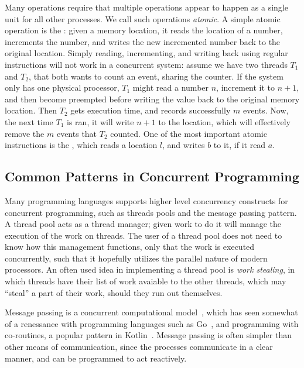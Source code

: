 Many operations require that multiple operations appear to happen as a single unit for all other
processes. We call such operations \emph{atomic}. A simple atomic operation is the
: given a memory location, it reads the location of a number, increments the
number, and writes the new incremented number back to the original location.  Simply reading,
incrementing, and writing back using regular instructions will not work in a concurrent system:
assume we have two threads $T_1$ and $T_2$, that both wants to count an event, sharing the counter.
If the system only has one physical processor, $T_1$ might read a number $n$, increment it to
$n+1$, and then become preempted before writing the value back to the original memory location.
Then $T_2$ gets execution time, and records successfully $m$ events. Now, the next time $T_1$ is
ran, it will write $n+1$ to the location, which will effectively remove the $m$ events that $T_2$
counted. One of the most important atomic instructions is the ,
which reads a location $l$, and writes $b$ to it, if it read $a$.

\subsection{Common Patterns in Concurrent Programming\label{sec:common-patterns}}

Many programming languages supports higher level concurrency constructs for concurrent programming,
such as threads pools and the message passing pattern. A thread pool acts as a thread manager;
given work to do it will manage the execution of the work on threads. The user of a thread pool
does not need to know how this management functions, only that the work is executed concurrently,
such that it hopefully utilizes the parallel nature of modern processors.  An often used idea in
implementing a thread pool is \emph{work stealing}\cite{blumofe1999scheduling}, in which threads
have their list of work avaiable to the other threads, which may ``steal'' a part of their work,
should they run out themselves.

Message passing is a concurrent computational model~\cite{hewitt1973session}, which has seen
somewhat of a renessance with programming languages such as Go~\cite{go}, and programming with
co-routines, a popular pattern in Kotlin~\cite{kotlin}. Message passing is often simpler than other
means of communication, since the processes communicate in a clear manner, and can be programmed to
act reactively.

